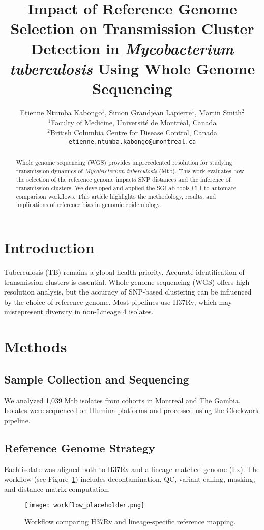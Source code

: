 \documentclass[12pt]{article}
\title{\textbf{Impact of Reference Genome Selection on Transmission Cluster Detection in \textit{Mycobacterium tuberculosis} Using Whole Genome Sequencing}}
\author{
Etienne Ntumba Kabongo$^{1}$, Simon Grandjean Lapierre$^{1}$, Martin Smith$^{2}$\\[1em]
\small $^{1}$Faculty of Medicine, Université de Montréal, Canada\\
\small $^{2}$British Columbia Centre for Disease Control, Canada\\
\small \texttt{etienne.ntumba.kabongo@umontreal.ca}
}
\date{}
\begin{document}
\maketitle

\begin{abstract}
Whole genome sequencing (WGS) provides unprecedented resolution for studying transmission dynamics of \textit{Mycobacterium tuberculosis} (Mtb). This work evaluates how the selection of the reference genome impacts SNP distances and the inference of transmission clusters. We developed and applied the SGLab-tools CLI to automate comparison workflows. This article highlights the methodology, results, and implications of reference bias in genomic epidemiology.
\end{abstract}

\section{Introduction}
Tuberculosis (TB) remains a global health priority. Accurate identification of transmission clusters is essential. Whole genome sequencing (WGS) offers high-resolution analysis, but the accuracy of SNP-based clustering can be influenced by the choice of reference genome. Most pipelines use H37Rv, which may misrepresent diversity in non-Lineage 4 isolates.

\section{Methods}
\subsection{Sample Collection and Sequencing}
We analyzed 1,039 Mtb isolates from cohorts in Montreal and The Gambia. Isolates were sequenced on Illumina platforms and processed using the Clockwork pipeline.

\subsection{Reference Genome Strategy}
Each isolate was aligned both to H37Rv and a lineage-matched genome (Lx). The workflow (see Figure~\ref{fig:workflow}) includes decontamination, QC, variant calling, masking, and distance matrix computation.

\begin{figure}[H]
    \centering
    \texttt{[image: workflow\_placeholder.png]}
    \caption{Workflow comparing H37Rv and lineage-specific reference mapping.}
    \label{fig:workflow}
\end{figure}
\end{document}
